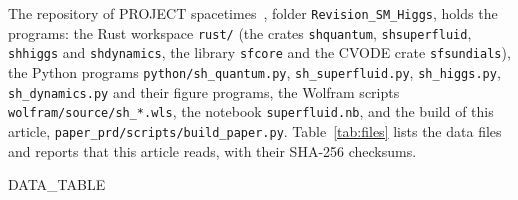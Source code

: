 \documentclass[aps,prd,onecolumn,superscriptaddress,nofootinbib,floatfix,longbibliography]{revtex4-2}
\begin{document}
The repository of PROJECT spacetimes~\cite{Repo}, folder \texttt{Revision\_SM\_Higgs}, holds the programs: the Rust
workspace \texttt{rust/} (the crates \texttt{shquantum}, \texttt{shsuperfluid}, \texttt{shhiggs} and \texttt{shdynamics}, the
library \texttt{sfcore} and the CVODE crate \texttt{sfsundials}), the Python programs \texttt{python/sh\_quantum.py},
\texttt{sh\_superfluid.py}, \texttt{sh\_higgs.py}, \texttt{sh\_dynamics.py} and their figure programs, the Wolfram scripts
\texttt{wolfram/source/sh\_*.wls}, the notebook \texttt{superfluid.nb}, and the build of this article,
\texttt{paper\_prd/scripts/build\_paper.py}. Table~\ref{tab:files} lists the data files and reports that this article reads,
with their SHA-256 checksums.

{{DATA_TABLE}}


\end{document}
